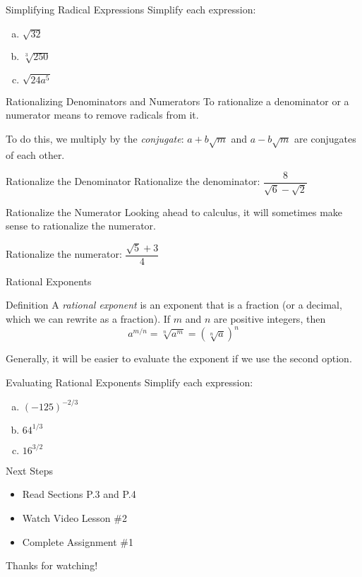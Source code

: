 \documentclass{beamer}
\newcommand{\fp}[1]{\left({#1}\right)} %
\begin{document}
\begin{frame}[t]{Simplifying Radical Expressions}
Simplify each expression: \begin{enumerate}[(a)]
\item $\sqrt{32}$
\item $\sqrt[3]{250}$
\item $\sqrt{24a^5}$
\end{enumerate}
\end{frame}

\begin{frame}[t]{Rationalizing Denominators and Numerators}
To rationalize a denominator or a numerator means to remove radicals from it.

To do this, we multiply by the \textit{conjugate}: $a + b\sqrt{m}$ and $a - b\sqrt{m}$ are conjugates of each other. 
\end{frame}

\begin{frame}[t]{Rationalize the Denominator}
Rationalize the denominator: $\dfrac{8}{\sqrt{6}-\sqrt{2}}$
\end{frame}

\begin{frame}[t]{Rationalize the Numerator}
Looking ahead to calculus, it will sometimes make sense to rationalize the numerator.

\vspace{12pt}

Rationalize the numerator: $\dfrac{\sqrt{5} + 3}{4}$
\end{frame}

\begin{frame}[t]{Rational Exponents}
\begin{block}{Definition}
A \textit{rational exponent} is an exponent that is a fraction (or a decimal, which we can rewrite as a fraction). If $m$ and $n$ are  positive integers, then $$a^{m/n} =\sqrt[n]{a^m} = \fp{\sqrt[n]{a}}^n$$
\end{block}

Generally, it will be easier to evaluate the exponent if we use the second option.
\end{frame}

\begin{frame}[t]{Evaluating Rational Exponents}
Simplify each expression:
\begin{enumerate}[(a)]
\item $(-125)^{-2/3}$
\item $64^{1/3}$
\item $16^{3/2}$
\end{enumerate}
\end{frame}

\begin{frame}[t]{Next Steps}
\begin{itemize}
\item Read Sections P.3 and P.4
\item Watch Video Lesson \#2
\item Complete Assignment \#1
\end{itemize}

\vfill

Thanks for watching!
\end{frame}
\end{document}
